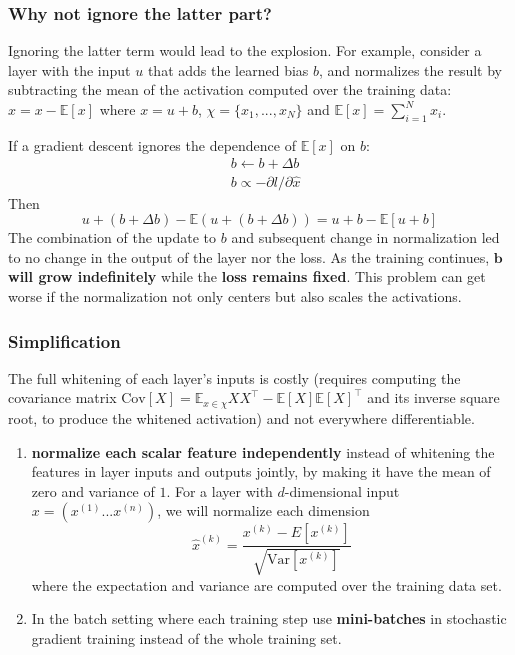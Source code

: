 \documentclass[a3paper, 12pt]{book} %
\begin{document}
\subsubsection{Why not ignore the latter part?}
Ignoring the latter term would lead to the explosion. For example, consider a layer
with the input $u$ that adds the learned bias $b$, and normalizes the result by subtracting the mean of the activation computed over the training data: $\hat{x}=x-\mathbb{E}[x]$ where $x=u+b$, $\chi=\{x_1,...,x_N\}$ and $\mathbb{E}[x]=\sum_{i=1}^{N}x_i$.
 
If a gradient descent ignores the dependence of $\mathbb{E}[x]$ on $b$:
\begin{equation}
\begin{split}
	& b \leftarrow b + \Delta{b} \\
    & b \propto -\partial{l} / \partial{\hat{x}}
\end{split}
\end{equation}
Then 
$$u+(b + \Delta{b})-\mathbb{E}{(u+(b + \Delta{b}))}=u+b-\mathbb{E}{[u+b]}$$
The combination of the update to $b$ and subsequent change in normalization led to no change in the output of the layer nor the loss. As the training continues, \textbf{$\mathbf{b}$ will grow indefinitely} while the \textbf{loss remains fixed}. This problem can get worse if the normalization not only centers but also scales the activations.
\subsubsection{Simplification}  
The full whitening of each layer's inputs is costly (requires computing the covariance matrix $\mathrm{Cov}[X]=\mathbb{E}_{x\in \chi}{XX^\top}-\mathbb{E}{[X]}\mathbb{E}{[X]}^\top$ and its inverse square root, to produce the whitened activation) and not everywhere differentiable.
\begin{enumerate}
	\item \textbf{normalize each scalar feature independently} instead of whitening the features in layer inputs and outputs jointly, by making it have the mean of zero and variance of $1$. For a layer with $d$-dimensional input $x=(x^{(1)}...x^{(n)})$, we will normalize each dimension 
	$$\hat{x}^{(k)}=\frac{x^{(k)}-E{[x^{(k)}]}}{\sqrt{\mathrm{Var}{[x^{(k)}]}}}$$ where the expectation and variance are computed over the training data set.
	
	
	\item In the batch setting where each training step use \textbf{mini-batches} in stochastic gradient training instead of the whole training set.
\end{enumerate}
\end{document}
